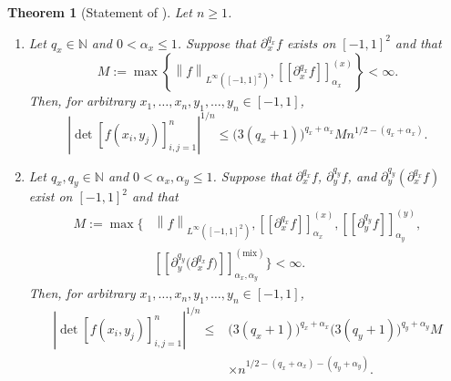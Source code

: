 \documentclass[11pt]{article}
\newtheorem*{restatedtheorem}{Theorem}
\theoremstyle{definition}
\theoremstyle{remark}
\newcommand{\norm}[1]{\left\lVert #1\right\rVert}
\newcommand{\abs}[1]{\left\lvert #1\right\rvert}
\newcommand{\seminorm}[1]{\left[\!\left[ #1\right]\!\right]}
\begin{document}
\begin{restatedtheorem}[Statement of ]
Let $n\ge1$.

\begin{enumerate}
\item
Let $q_x\in\mathbb N$ and $0<\alpha_x\le1$.
Suppose that $\partial_x^{q_x}f$ exists on $[-1,1]^2$ and that
\[
    M
    :=
    \max\left\{
      \norm{f}_{L^\infty([-1,1]^2)},
      \seminorm{\partial_x^{q_x}f}_{\alpha_x}^{(x)}
    \right\}
    <\infty.
\]
Then, for arbitrary
$x_1,\ldots,x_n,y_1,\ldots,y_n\in [-1, 1]$,
\[
    \abs{\det[f(x_i,y_j)]_{i,j=1}^n}^{1/n}
    \le
    \bigl(3(q_x+1)\bigr)^{q_x+\alpha_x}
    M n^{1/2-(q_x+\alpha_x)}.
\]

\item
Let $q_x,q_y\in\mathbb N$ and
$0<\alpha_x,\alpha_y\le1$. Suppose that
$\partial_x^{q_x}f$, $\partial_y^{q_y}f$, and
$\partial_y^{q_y}(\partial_x^{q_x}f)$ exist on $[-1,1]^2$ and that
\[
\begin{aligned}
    M
    :=
    \max\biggl\{&
      \norm{f}_{L^\infty([-1,1]^2)},
      \seminorm{\partial_x^{q_x}f}_{\alpha_x}^{(x)},
      \seminorm{\partial_y^{q_y}f}_{\alpha_y}^{(y)},\\
      &\seminorm{
        \partial_y^{q_y}\bigl(\partial_x^{q_x}f\bigr)
      }_{\alpha_x,\alpha_y}^{(\mathrm{mix})}
    \biggr\}
    <\infty.
\end{aligned}
\]
Then, for arbitrary
$x_1,\ldots,x_n,y_1,\ldots,y_n\in [-1, 1]$,
\[
\begin{aligned}
    \abs{\det[f(x_i,y_j)]_{i,j=1}^n}^{1/n}
    \le{}&
    \bigl(3(q_x+1)\bigr)^{q_x+\alpha_x}
    \bigl(3(q_y+1)\bigr)^{q_y+\alpha_y}
    M\\
    &\times
    n^{1/2-(q_x+\alpha_x)-(q_y+\alpha_y)}.
\end{aligned}
\]
\end{enumerate}
\end{restatedtheorem}
\end{document}
